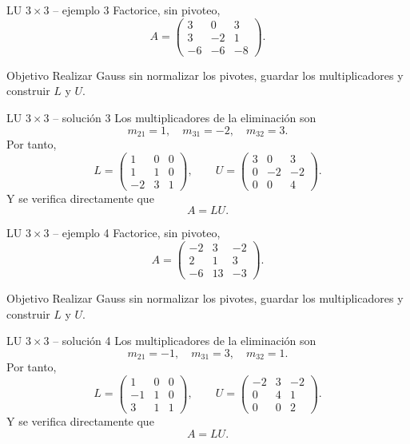 \documentclass[aspectratio=169,10pt]{beamer}
\begin{document}
\begin{frame}{LU $3\times 3$ -- ejemplo 3}
\small
Factorice, sin pivoteo,
\[
A=\begin{pmatrix}3 & 0 & 3\\3 & -2 & 1\\-6 & -6 & -8\end{pmatrix}.
\]
\begin{block}{Objetivo}
Realizar Gauss sin normalizar los pivotes, guardar los multiplicadores y construir $L$ y $U$.
\end{block}
\end{frame}
\begin{frame}{LU $3\times 3$ -- solución 3}
\small
Los multiplicadores de la eliminación son
\[
m_{21}=1,\quad m_{31}=-2,\quad m_{32}=3.
\]
Por tanto,
\[
L=\begin{pmatrix}1 & 0 & 0\\1 & 1 & 0\\-2 & 3 & 1\end{pmatrix},\qquad U=\begin{pmatrix}3 & 0 & 3\\0 & -2 & -2\\0 & 0 & 4\end{pmatrix}.
\]
Y se verifica directamente que
\[
\boxed{A=LU}.
\]
\end{frame}
\begin{frame}{LU $3\times 3$ -- ejemplo 4}
\small
Factorice, sin pivoteo,
\[
A=\begin{pmatrix}-2 & 3 & -2\\2 & 1 & 3\\-6 & 13 & -3\end{pmatrix}.
\]
\begin{block}{Objetivo}
Realizar Gauss sin normalizar los pivotes, guardar los multiplicadores y construir $L$ y $U$.
\end{block}
\end{frame}
\begin{frame}{LU $3\times 3$ -- solución 4}
\small
Los multiplicadores de la eliminación son
\[
m_{21}=-1,\quad m_{31}=3,\quad m_{32}=1.
\]
Por tanto,
\[
L=\begin{pmatrix}1 & 0 & 0\\-1 & 1 & 0\\3 & 1 & 1\end{pmatrix},\qquad U=\begin{pmatrix}-2 & 3 & -2\\0 & 4 & 1\\0 & 0 & 2\end{pmatrix}.
\]
Y se verifica directamente que
\[
\boxed{A=LU}.
\]
\end{frame}
\end{document}
